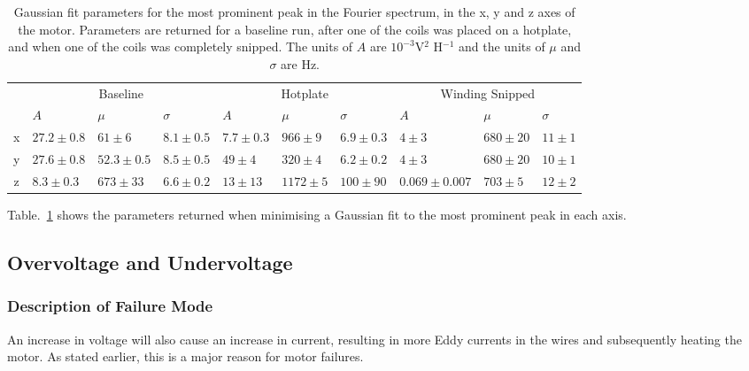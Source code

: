 


\begin{table}[]
\centering
\begin{tabular}{c|p{1.45cm}p{1.25cm}p{1.3cm}|p{1.2cm}p{1.2cm}p{1.3cm}|p{1.45cm}p{1.25cm}p{1.15cm}}
  & \multicolumn{3}{c|}{Baseline}                    & \multicolumn{3}{c|}{Hotplate}    \cline{2-10}            & \multicolumn{3}{c}{Winding Snipped}           \\ \cline{2-10} 
  & $A$            & $\mu$      & $\sigma$ & $A$           & $\mu$   & $\sigma$ & $A$               & $\mu$   & $\sigma$ \\ \hline
x & $27.2 \pm 0.8$ & $61 \pm 6$      & $8.1 \pm 0.5$ & $7.7 \pm 0.3$ & $966 \pm 9$  & $6.9 \pm 0.3$ & $4 \pm 3$         & $680 \pm 20$ & $11 \pm 1$ \\
y & $27.6 \pm 0.8$ & $52.3 \pm 0.5 $ & $8.5 \pm 0.5$ & $49 \pm 4$    & $320 \pm 4$  & $6.2 \pm 0.2$ & $4 \pm 3$         & $680 \pm 20$ & $10 \pm 1$ \\
z & $8.3 \pm 0.3$  & $673 \pm 33$    & $6.6 \pm 0.2$ & $13 \pm 13$   & $1172 \pm 5$ & $100 \pm 90$  & $0.069 \pm 0.007$ & $703 \pm 5$  & $12 \pm 2$
\end{tabular}
\label{overheating_table}
\caption[Gaussian Fit Parameters for Overheating]{Gaussian fit parameters for the most prominent peak in the Fourier spectrum, in the x, y and z axes of the motor. Parameters are returned for a baseline run, after one of the coils was placed on a hotplate, and when one of the coils was completely snipped. The units of $A$ are $10^{-3}$V$^2$ H$^{-1}$ and the units of $\mu$ and $\sigma$ are Hz.}
\end{table}

Table.~\ref{overheating_table} shows the parameters returned when minimising a Gaussian fit to the most prominent peak in each axis. 


\subsection{Overvoltage and Undervoltage}

\subsubsection{Description of Failure Mode}
An increase in voltage will also cause an increase in current, resulting in more Eddy currents in the wires and subsequently heating the motor. As stated earlier, this is a major reason for motor failures. 

